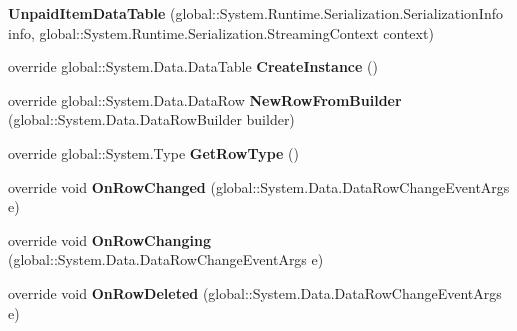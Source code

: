 \begin{DoxyCompactItemize}
\item 
{\bfseries Unpaid\+Item\+Data\+Table} (global\+::\+System.\+Runtime.\+Serialization.\+Serialization\+Info info, global\+::\+System.\+Runtime.\+Serialization.\+Streaming\+Context context)\hypertarget{class_products_1_1_data_1_1ds_sage_1_1_unpaid_item_data_table_abfa5084b2340c95c7cb2830ae522afa6}{}\label{class_products_1_1_data_1_1ds_sage_1_1_unpaid_item_data_table_abfa5084b2340c95c7cb2830ae522afa6}

\item 
override global\+::\+System.\+Data.\+Data\+Table {\bfseries Create\+Instance} ()\hypertarget{class_products_1_1_data_1_1ds_sage_1_1_unpaid_item_data_table_accee608308cf68b1ff3ed29224bd0e2d}{}\label{class_products_1_1_data_1_1ds_sage_1_1_unpaid_item_data_table_accee608308cf68b1ff3ed29224bd0e2d}

\item 
override global\+::\+System.\+Data.\+Data\+Row {\bfseries New\+Row\+From\+Builder} (global\+::\+System.\+Data.\+Data\+Row\+Builder builder)\hypertarget{class_products_1_1_data_1_1ds_sage_1_1_unpaid_item_data_table_a92562d31e39f8b15ba9505ce445c9ae5}{}\label{class_products_1_1_data_1_1ds_sage_1_1_unpaid_item_data_table_a92562d31e39f8b15ba9505ce445c9ae5}

\item 
override global\+::\+System.\+Type {\bfseries Get\+Row\+Type} ()\hypertarget{class_products_1_1_data_1_1ds_sage_1_1_unpaid_item_data_table_ab78ef831fb6f746504251658443dff75}{}\label{class_products_1_1_data_1_1ds_sage_1_1_unpaid_item_data_table_ab78ef831fb6f746504251658443dff75}

\item 
override void {\bfseries On\+Row\+Changed} (global\+::\+System.\+Data.\+Data\+Row\+Change\+Event\+Args e)\hypertarget{class_products_1_1_data_1_1ds_sage_1_1_unpaid_item_data_table_a5d3fced2d86e0a53af553f83bb436416}{}\label{class_products_1_1_data_1_1ds_sage_1_1_unpaid_item_data_table_a5d3fced2d86e0a53af553f83bb436416}

\item 
override void {\bfseries On\+Row\+Changing} (global\+::\+System.\+Data.\+Data\+Row\+Change\+Event\+Args e)\hypertarget{class_products_1_1_data_1_1ds_sage_1_1_unpaid_item_data_table_ab518b4e6fed8b9093d061496174a6f26}{}\label{class_products_1_1_data_1_1ds_sage_1_1_unpaid_item_data_table_ab518b4e6fed8b9093d061496174a6f26}

\item 
override void {\bfseries On\+Row\+Deleted} (global\+::\+System.\+Data.\+Data\+Row\+Change\+Event\+Args e)\hypertarget{class_products_1_1_data_1_1ds_sage_1_1_unpaid_item_data_table_ab593a455762b50974519f0911420495d}{}\label{class_products_1_1_data_1_1ds_sage_1_1_unpaid_item_data_table_ab593a455762b50974519f0911420495d}


\end{DoxyCompactItemize}
